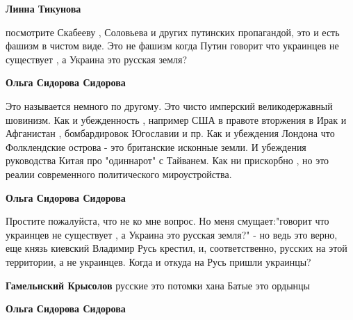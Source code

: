 \begin{itemize}
\begin{itemize}
\textbf{Линна Тикунова} 

посмотрите Скабееву , Соловьева и других путинских пропагандой, это и есть
фашизм в чистом виде. Это не фашизм когда Путин говорит что украинцев не
существует , а Украина это русская земля?


 
\textbf{Ольга Сидорова Сидорова} 

Это называется немного по другому. Это чисто
имперский великодержавный шовинизм. Как и убежденность , например США в правоте
вторжения в Ирак и Афганистан , бомбардировок Югославии и пр. Как и убеждения
Лондона что Фолклендские острова - это британские исконные земли. И убеждения
руководства Китая про "одиннарот" с Тайванем. Как ни прискорбно , но это реалии
современного политического мироустройства.

 
\textbf{Ольга Сидорова Сидорова} 

Простите пожалуйста, что не ко мне вопрос. Но
меня смущает:"говорит что украинцев не существует , а Украина это русская
земля?" - но ведь это верно, еще князь киевский Владимир Русь крестил, и,
соответственно, русских на этой территории, а не украинцев. Когда и откуда на
Русь пришли украинцы?


 
\textbf{Гамельнский Крысолов} русские это потомки хана Батые это ордынцы

 
\textbf{Ольга Сидорова Сидорова} 


\end{itemize}
\end{itemize}
